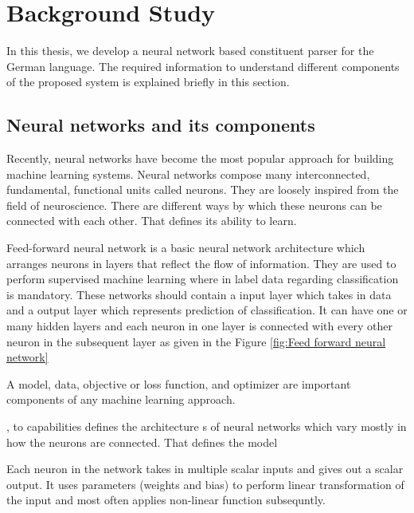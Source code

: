 \documentclass[a4paper, 11pt]{article}
\begin{document}




\pagebreak
\section{Background Study}
In this thesis, we develop a neural network based constituent parser for the German language. The required information to understand different components of the proposed system is explained briefly in this section. 

\subsection{Neural networks and its components}

Recently, neural networks have become the most popular approach for building machine learning systems. Neural networks compose many interconnected, fundamental, functional units called neurons. They are loosely inspired from the field of neuroscience. There are different ways by which these neurons can be connected with each other. That defines its ability to learn. 

Feed-forward neural network \parencite{Svozil1997} is a basic neural network architecture which arranges neurons in layers that reflect the flow of information. They are used to perform supervised machine learning where in label data regarding classification is mandatory. These networks should contain a input layer which takes in data and a output layer which represents prediction of classification. It can have one or many hidden layers and each neuron in one layer is connected with every other neuron in the subsequent layer as given in the Figure \ref{fig:Feed forward neural network}

A model, data, objective or loss function, and optimizer are important components of any machine learning approach.

,  to capabilities defines the architecture s of neural networks which vary mostly in how the neurons are connected. That defines the model

Each neuron in the network takes in multiple scalar inputs and gives out a scalar output. It uses parameters (weights and bias) to perform linear transformation of the input and most often applies non-linear function subsequntly.
\end{document}
